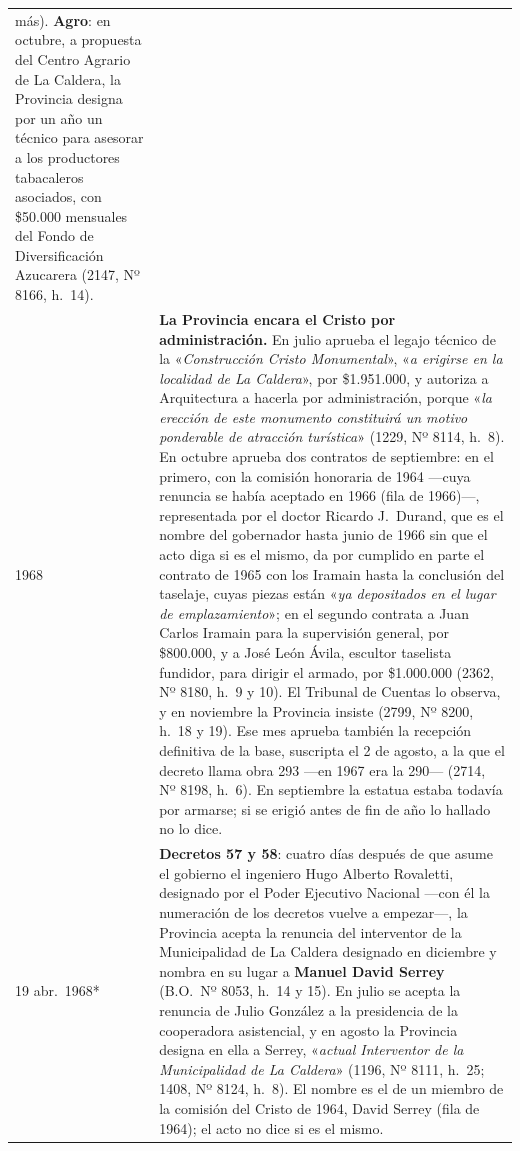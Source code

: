 \begin{longtable}{@{}p{2.7cm}p{10.3cm}@{}}
más). \textbf{Agro}: en octubre, a propuesta del Centro Agrario de La Caldera, la Provincia designa por un año un técnico para asesorar a los productores tabacaleros asociados, con \$50.000 mensuales del Fondo de Diversificación Azucarera (2147, Nº 8166, h.\ 14). \\
1968 & \textbf{La Provincia encara el Cristo por administración.} En julio aprueba el legajo técnico de la «\textit{Construcción Cristo Monumental}», «\textit{a erigirse en la localidad de La Caldera}», por \$1.951.000, y autoriza a Arquitectura a hacerla por administración, porque «\textit{la erección de este monumento constituirá un motivo ponderable de atracción turística}» (1229, Nº 8114, h.\ 8). En octubre aprueba dos contratos de septiembre: en el primero, con la comisión honoraria de 1964 ---cuya renuncia se había aceptado en 1966 (fila de 1966)---, representada por el doctor Ricardo J.\ Durand, que es el nombre del gobernador hasta junio de 1966 sin que el acto diga si es el mismo, da por cumplido en parte el contrato de 1965 con los Iramain hasta la conclusión del taselaje, cuyas piezas están «\textit{ya depositados en el lugar de emplazamiento}»; en el segundo contrata a Juan Carlos Iramain para la supervisión general, por \$800.000, y a José León Ávila, escultor taselista fundidor, para dirigir el armado, por \$1.000.000 (2362, Nº 8180, h.\ 9 y 10). El Tribunal de Cuentas lo observa, y en noviembre la Provincia insiste (2799, Nº 8200, h.\ 18 y 19). Ese mes aprueba también la recepción definitiva de la base, suscripta el 2 de agosto, a la que el decreto llama obra 293 ---en 1967 era la 290--- (2714, Nº 8198, h.\ 6). En septiembre la estatua estaba todavía por armarse; si se erigió antes de fin de año lo hallado no lo dice. \\
19 abr.\ 1968* & \textbf{Decretos 57 y 58}: cuatro días después de que asume el gobierno el ingeniero Hugo Alberto Rovaletti, designado por el Poder Ejecutivo Nacional ---con él la numeración de los decretos vuelve a empezar---, la Provincia acepta la renuncia del interventor de la Municipalidad de La Caldera designado en diciembre y nombra en su lugar a \textbf{Manuel David Serrey} (B.O.\ Nº 8053, h.\ 14 y 15). En julio se acepta la renuncia de Julio González a la presidencia de la cooperadora asistencial, y en agosto la Provincia designa en ella a Serrey, «\textit{actual Interventor de la Municipalidad de La Caldera}» (1196, Nº 8111, h.\ 25; 1408, Nº 8124, h.\ 8). El nombre es el de un miembro de la comisión del Cristo de 1964, David Serrey (fila de 1964); el acto no dice si es el mismo. \\

\end{longtable}
